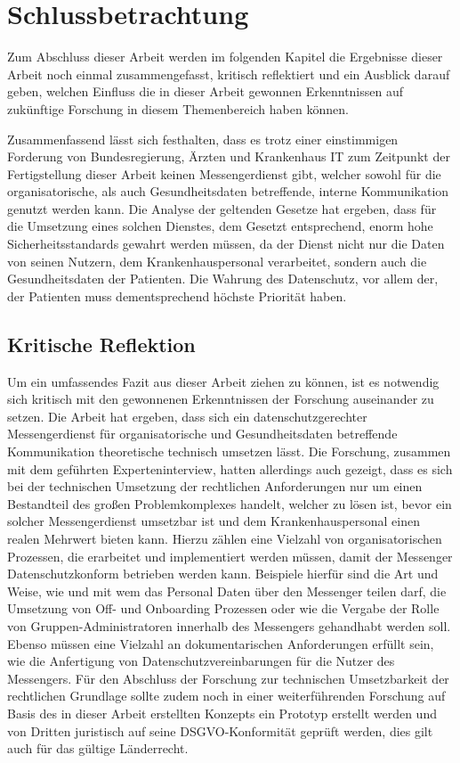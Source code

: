 \chapter{Schlussbetrachtung}\label{chapter:schlussbetrachtung}
Zum Abschluss dieser Arbeit werden im folgenden Kapitel die Ergebnisse dieser Arbeit noch einmal zusammengefasst, kritisch reflektiert und ein Ausblick darauf geben, welchen Einfluss die in dieser Arbeit gewonnen Erkenntnissen auf zukünftige Forschung in diesem Themenbereich haben können.

Zusammenfassend lässt sich festhalten, dass es trotz einer einstimmigen Forderung von Bundesregierung, Ärzten und Krankenhaus IT zum Zeitpunkt der Fertigstellung dieser Arbeit keinen Messengerdienst gibt, welcher sowohl für die organisatorische, als auch Gesundheitsdaten betreffende, interne Kommunikation genutzt werden kann. Die Analyse der geltenden Gesetze hat ergeben, dass für die Umsetzung eines solchen Dienstes, dem Gesetzt entsprechend, enorm hohe Sicherheitsstandards gewahrt werden müssen, da der Dienst nicht nur die Daten von seinen Nutzern, dem Krankenhauspersonal verarbeitet, sondern auch die Gesundheitsdaten der Patienten. Die Wahrung des Datenschutz, vor allem der, der Patienten muss dementsprechend höchste Priorität haben. 

\section{Kritische Reflektion}\label{chapter:kr}
Um ein umfassendes Fazit aus dieser Arbeit ziehen zu können, ist es notwendig sich kritisch mit den gewonnenen Erkenntnissen der Forschung auseinander zu setzen. Die Arbeit hat ergeben, dass sich ein datenschutzgerechter Messengerdienst für organisatorische und Gesundheitsdaten betreffende Kommunikation theoretische technisch umsetzen lässt. Die Forschung, zusammen mit dem geführten Experteninterview, hatten allerdings auch gezeigt, dass es sich bei der technischen Umsetzung der rechtlichen Anforderungen nur um einen Bestandteil des großen Problemkomplexes handelt, welcher zu lösen ist, bevor ein solcher Messengerdienst umsetzbar ist und dem Krankenhauspersonal einen realen Mehrwert bieten kann.  Hierzu zählen eine Vielzahl von organisatorischen Prozessen, die erarbeitet und implementiert werden müssen, damit der Messenger Datenschutzkonform betrieben werden kann. Beispiele hierfür sind die Art und Weise, wie und mit wem das Personal Daten über den Messenger teilen darf, die Umsetzung von Off- und Onboarding Prozessen oder wie die Vergabe der Rolle von Gruppen-Administratoren innerhalb des Messengers gehandhabt werden soll. Ebenso müssen eine Vielzahl an dokumentarischen Anforderungen erfüllt sein, wie die Anfertigung von Datenschutzvereinbarungen für die Nutzer des Messengers.
Für den Abschluss der Forschung zur technischen Umsetzbarkeit der rechtlichen Grundlage sollte zudem noch in einer weiterführenden Forschung auf Basis des in dieser Arbeit erstellten Konzepts ein Prototyp erstellt werden und von Dritten juristisch auf seine DSGVO-Konformität geprüft werden, dies gilt auch für das gültige Länderrecht.

